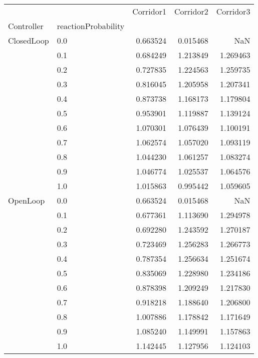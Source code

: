 \begin{tabular}{llrrr}
\toprule
         &     &  Corridor1 &  Corridor2 &  Corridor3 \\
Controller & reactionProbability &            &            &            \\
\midrule
ClosedLoop & 0.0 &   0.663524 &   0.015468 &        NaN \\
         & 0.1 &   0.684249 &   1.213849 &   1.269463 \\
         & 0.2 &   0.727835 &   1.224563 &   1.259735 \\
         & 0.3 &   0.816045 &   1.205958 &   1.207341 \\
         & 0.4 &   0.873738 &   1.168173 &   1.179804 \\
         & 0.5 &   0.953901 &   1.119887 &   1.139124 \\
         & 0.6 &   1.070301 &   1.076439 &   1.100191 \\
         & 0.7 &   1.062574 &   1.057020 &   1.093119 \\
         & 0.8 &   1.044230 &   1.061257 &   1.083274 \\
         & 0.9 &   1.046774 &   1.025537 &   1.064576 \\
         & 1.0 &   1.015863 &   0.995442 &   1.059605 \\
OpenLoop & 0.0 &   0.663524 &   0.015468 &        NaN \\
         & 0.1 &   0.677361 &   1.113690 &   1.294978 \\
         & 0.2 &   0.692280 &   1.243592 &   1.270187 \\
         & 0.3 &   0.723469 &   1.256283 &   1.266773 \\
         & 0.4 &   0.787354 &   1.256634 &   1.251674 \\
         & 0.5 &   0.835069 &   1.228980 &   1.234186 \\
         & 0.6 &   0.878398 &   1.209249 &   1.217830 \\
         & 0.7 &   0.918218 &   1.188640 &   1.206800 \\
         & 0.8 &   1.007886 &   1.178842 &   1.171649 \\
         & 0.9 &   1.085240 &   1.149991 &   1.157863 \\
         & 1.0 &   1.142445 &   1.127956 &   1.124103 \\
\bottomrule
\end{tabular}
